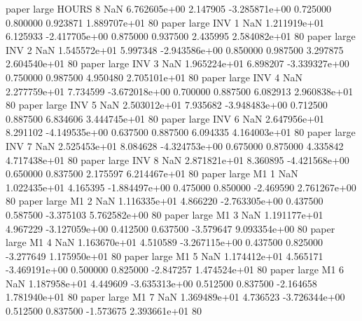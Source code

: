             paper      large    HOURS                 8                  NaN 6.762605e+00      2.147905 -3.285871e+00 0.725000 0.800000       0.923871 1.889707e+01 80
            paper      large      INV                 1                  NaN 1.211919e+01      6.125933 -2.417705e+00 0.875000 0.937500       2.435995 2.584082e+01 80
            paper      large      INV                 2                  NaN 1.545572e+01      5.997348 -2.943586e+00 0.850000 0.987500       3.297875 2.604540e+01 80
            paper      large      INV                 3                  NaN 1.965224e+01      6.898207 -3.339327e+00 0.750000 0.987500       4.950480 2.705101e+01 80
            paper      large      INV                 4                  NaN 2.277759e+01      7.734599 -3.672018e+00 0.700000 0.887500       6.082913 2.960838e+01 80
            paper      large      INV                 5                  NaN 2.503012e+01      7.935682 -3.948483e+00 0.712500 0.887500       6.834606 3.444745e+01 80
            paper      large      INV                 6                  NaN 2.647956e+01      8.291102 -4.149535e+00 0.637500 0.887500       6.094335 4.164003e+01 80
            paper      large      INV                 7                  NaN 2.525453e+01      8.084628 -4.324753e+00 0.675000 0.875000       4.335842 4.717438e+01 80
            paper      large      INV                 8                  NaN 2.871821e+01      8.360895 -4.421568e+00 0.650000 0.837500       2.175597 6.214467e+01 80
            paper      large       M1                 1                  NaN 1.022435e+01      4.165395 -1.884497e+00 0.475000 0.850000      -2.469590 2.761267e+00 80
            paper      large       M1                 2                  NaN 1.116335e+01      4.866220 -2.763305e+00 0.437500 0.587500      -3.375103 5.762582e+00 80
            paper      large       M1                 3                  NaN 1.191177e+01      4.967229 -3.127059e+00 0.412500 0.637500      -3.579647 9.093354e+00 80
            paper      large       M1                 4                  NaN 1.163670e+01      4.510589 -3.267115e+00 0.437500 0.825000      -3.277649 1.175950e+01 80
            paper      large       M1                 5                  NaN 1.174412e+01      4.565171 -3.469191e+00 0.500000 0.825000      -2.847257 1.474524e+01 80
            paper      large       M1                 6                  NaN 1.187958e+01      4.449609 -3.635313e+00 0.512500 0.837500      -2.164658 1.781940e+01 80
            paper      large       M1                 7                  NaN 1.369489e+01      4.736523 -3.726344e+00 0.512500 0.837500      -1.573675 2.393661e+01 80
